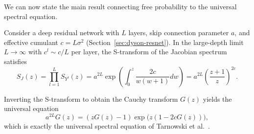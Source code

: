 We can now state the main result connecting free probability to the universal spectral equation.

\begin{theorem}\label{thm:universal-via-s}
Consider a deep residual network with $L$ layers, skip connection parameter $a$, and effective cumulant $c = L\sigma^2$ (Section~\ref{sec:dyson-resnet}). In the large-depth limit $L \to \infty$ with $c^l \sim c/L$ per layer, the S-transform of the Jacobian spectrum satisfies
\begin{equation}\label{eq:s-composition}
S_J(z) = \prod_{l=1}^L S_{Y^l}(z) = a^{2L} \exp\left(\int_0^z \frac{2c}{w(w+1)} dw\right) = a^{2L} \left(\frac{z+1}{z}\right)^{2c}.
\end{equation}

Inverting the S-transform to obtain the Cauchy transform $G(z)$ yields the universal equation
\begin{equation}\label{eq:universal-from-s}
\boxed{a^{2L} G(z) = (zG(z) - 1) \exp\bigl(z(1 - 2cG(z))\bigr),}
\end{equation}
which is exactly the universal spectral equation of Tarnowski et al.~\cite{tarnowski2019dynamical}.
\end{theorem}

